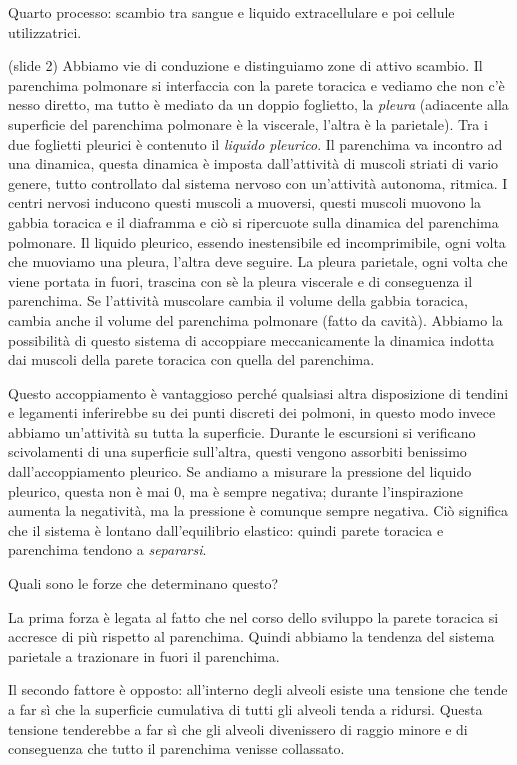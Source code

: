 \documentclass[a4paper,12pt]{article}
\begin{document}
Quarto processo: scambio tra sangue e liquido extracellulare e poi cellule utilizzatrici.

(slide 2) Abbiamo vie di conduzione e distinguiamo zone di attivo scambio. Il parenchima polmonare si interfaccia con la parete toracica e vediamo che non c'è nesso diretto, ma tutto è mediato da un doppio foglietto, la \emph{pleura} (adiacente alla superficie del parenchima polmonare è la viscerale, l'altra è la parietale). Tra i due foglietti pleurici è contenuto il \emph{liquido pleurico}. Il parenchima va incontro ad una dinamica, questa dinamica è imposta dall'attività di muscoli striati di vario genere, tutto controllato dal sistema nervoso con un'attività autonoma, ritmica. I centri nervosi inducono questi muscoli a muoversi, questi muscoli muovono la gabbia toracica e il diaframma e ciò si ripercuote sulla dinamica del parenchima polmonare. Il liquido pleurico, essendo inestensibile ed incomprimibile, ogni volta che muoviamo una pleura, l'altra deve seguire. La pleura parietale, ogni volta che viene portata in fuori, trascina con sè la pleura viscerale e di conseguenza il parenchima. Se l'attività muscolare cambia il volume della gabbia toracica, cambia anche il volume del parenchima polmonare (fatto da cavità). Abbiamo la possibilità di questo sistema di accoppiare meccanicamente la dinamica indotta dai muscoli della parete toracica con quella del parenchima.

Questo accoppiamento è vantaggioso perché qualsiasi altra disposizione di tendini e legamenti inferirebbe su dei punti discreti dei polmoni, in questo modo invece abbiamo un'attività su tutta la superficie. Durante le escursioni si verificano scivolamenti di una superficie sull'altra, questi vengono assorbiti benissimo dall'accoppiamento pleurico. Se andiamo a misurare la pressione del liquido pleurico, questa non è mai 0, ma è sempre negativa; durante l'inspirazione aumenta la negatività, ma la pressione è comunque sempre negativa. Ciò significa che il sistema è lontano dall'equilibrio elastico: quindi parete toracica e parenchima tendono a \emph{separarsi}. 

Quali sono le forze che determinano questo? 

La prima forza è legata al fatto che nel corso dello sviluppo la parete toracica si accresce di più rispetto al parenchima. Quindi abbiamo la tendenza del sistema parietale a trazionare in fuori il parenchima.

Il secondo fattore è opposto: all'interno degli alveoli esiste una tensione che tende a far sì che la superficie cumulativa di tutti gli alveoli tenda a ridursi. Questa tensione tenderebbe a far sì che gli alveoli divenissero di raggio minore e di conseguenza che tutto il parenchima venisse collassato. 
\end{document}
